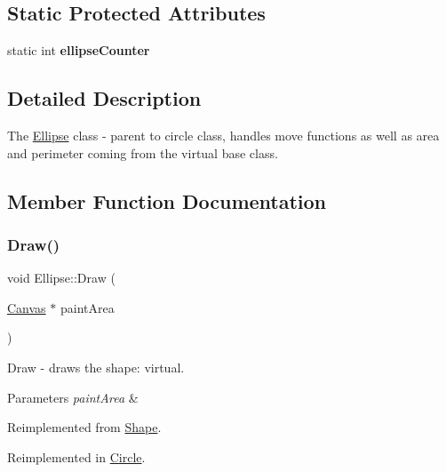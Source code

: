 \subsection*{Static Protected Attributes}
\begin{DoxyCompactItemize}
\item 
\mbox{\label{class_ellipse_ad58a3d79058ccc3a31b3fc6bc6cd9a30}} 
static int {\bfseries ellipse\+Counter}
\end{DoxyCompactItemize}


\subsection{Detailed Description}
The \hyperlink{class_ellipse}{Ellipse} class -\/ parent to circle class, handles move functions as well as area and perimeter coming from the virtual base class. 

\subsection{Member Function Documentation}
\mbox{\label{class_ellipse_aaf9524151dc799501327f72c75e0f010}} 
\subsubsection{\texorpdfstring{Draw()}{Draw()}}
{\footnotesize\ttfamily void Ellipse\+::\+Draw (\begin{DoxyParamCaption}\item[{\hyperlink{class_canvas}{Canvas} $\ast$}]{paint\+Area }\end{DoxyParamCaption})\hspace{0.3cm}{\ttfamily [virtual]}}



Draw -\/ draws the shape\+: virtual. 


\begin{DoxyParams}{Parameters}
{\em paint\+Area} & \\
\hline
\end{DoxyParams}


Reimplemented from \hyperlink{class_shape_ad7cc6a5e97b0971d50999bce4396127a}{Shape}.



Reimplemented in \hyperlink{class_circle_a5bebd94955572edce0ad10208a449772}{Circle}.

